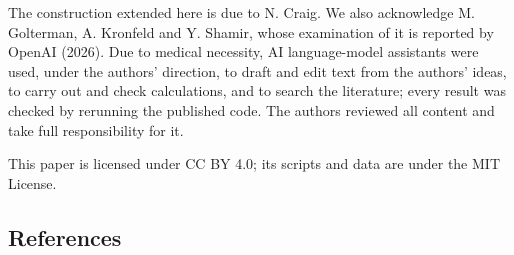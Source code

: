 \documentclass[
]{article}
\begin{document}
The construction extended here is due to N. Craig. We also acknowledge
M. Golterman, A. Kronfeld and Y. Shamir, whose examination of it is
reported by OpenAI (2026). Due to medical necessity, AI language-model
assistants were used, under the authors' direction, to draft and edit
text from the authors' ideas, to carry out and check calculations, and
to search the literature; every result was checked by rerunning the
published code. The authors reviewed all content and take full
responsibility for it.

This paper is licensed under CC BY 4.0; its scripts and data are under
the MIT License.

\hypertarget{references}{%
\subsection{References}\label{references}}
\end{document}
